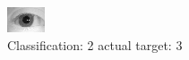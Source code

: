 \begin{figure}[h!]
\begin{center}
\includegraphics[width=0.60\columnwidth]{figures/ID1101_class_2_target_3.png}
\end{center}
\caption{ Classification: 2 actual target: 3}
\label{fig:ID1101_class_2_target_3}
\end{figure}
